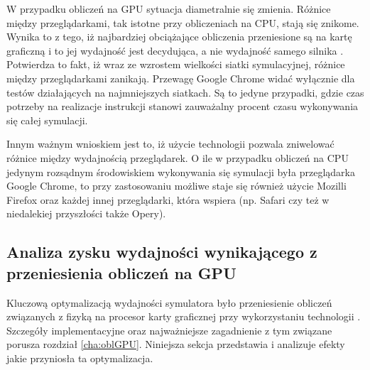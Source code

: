 W przypadku obliczeń na GPU sytuacja diametralnie się zmienia. Różnice między
przeglądarkami, tak istotne przy obliczeniach na CPU, stają się znikome.
Wynika to z tego, iż najbardziej obciążające obliczenia przeniesione są na
kartę graficzną i to jej wydajność jest decydująca, a nie wydajność samego
silnika .  Potwierdza to fakt, iż wraz ze wzrostem wielkości
siatki symulacyjnej, różnice między przeglądarkami zanikają. Przewagę Google
Chrome widać wyłącznie dla testów działających na najmniejszych siatkach. Są
to jedyne przypadki, gdzie czas potrzeby na realizacje instrukcji \js
stanowi zauważalny procent czasu wykonywania się całej symulacji.

Innym ważnym wnioskiem jest to, iż użycie technologii  pozwala
zniwelować różnice między wydajnością przeglądarek. O ile w przypadku obliczeń
na CPU jedynym rozsądnym środowiskiem wykonywania się symulacji była
przeglądarka Google Chrome, to przy zastosowaniu  możliwe staje się
również użycie Mozilli Firefox oraz każdej innej przeglądarki, która wspiera
 (np. Safari czy też w niedalekiej przyszłości także Opery).

\subsection{Analiza zysku wydajności wynikającego z przeniesienia obliczeń na GPU}
\label{sec:analizaGPUCPU}

Kluczową optymalizacją wydajności symulatora \en było przeniesienie obliczeń
związanych z fizyką na procesor karty graficznej przy wykorzystaniu technologii
. Szczegóły implementacyjne oraz najważniejsze zagadnienie z tym
związane porusza rozdział \ref{cha:oblGPU}. Niniejsza sekcja przedstawia i
analizuje efekty jakie przyniosła ta optymalizacja.

